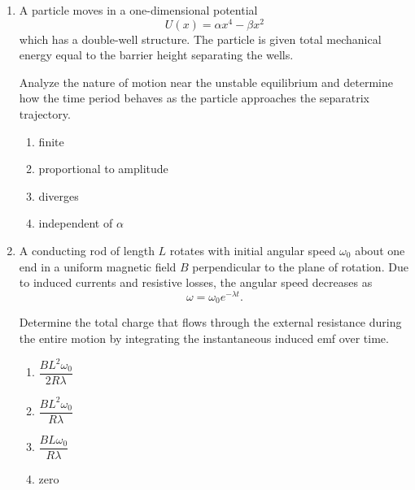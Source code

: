 \documentclass[12pt]{article}
\begin{document}
\begin{enumerate}
Determine the total heat generated in the resistor during the entire transient process by considering conservation of energy in the RLC circuit.

\begin{enumerate}
\item $\dfrac{1}{2}CV^2$
\item $CV^2$
\item $\dfrac{1}{4}CV^2$
\item zero
\end{enumerate}

\item
A particle moves in a one-dimensional potential
\[
U(x)=\alpha x^4-\beta x^2
\]
which has a double-well structure. The particle is given total mechanical energy equal to the barrier height separating the wells.

Analyze the nature of motion near the unstable equilibrium and determine how the time period behaves as the particle approaches the separatrix trajectory.

\begin{enumerate}
\item finite
\item proportional to amplitude
\item diverges
\item independent of $\alpha$
\end{enumerate}

\item
A conducting rod of length $L$ rotates with initial angular speed $\omega_0$ about one end in a uniform magnetic field $B$ perpendicular to the plane of rotation. Due to induced currents and resistive losses, the angular speed decreases as
\[
\omega=\omega_0 e^{-\lambda t}.
\]

Determine the total charge that flows through the external resistance during the entire motion by integrating the instantaneous induced emf over time.


\begin{enumerate}
\item $\dfrac{BL^2\omega_0}{2R\lambda}$
\item $\dfrac{BL^2\omega_0}{R\lambda}$
\item $\dfrac{BL\omega_0}{R\lambda}$
\item zero
\end{enumerate}


\end{enumerate}
\end{document}
